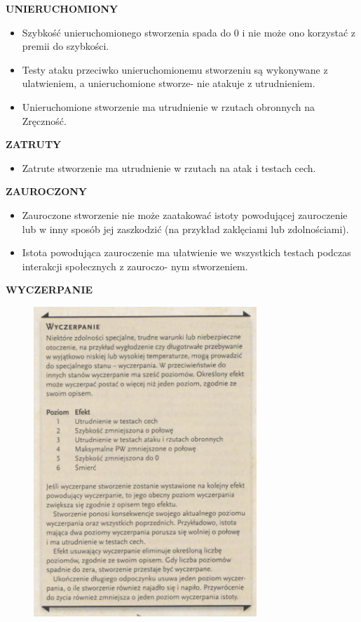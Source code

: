 \documentclass[14pt]{article}
\begin{document}
\textbf{UNIERUCHOMIONY}
\begin{itemize}
    \item Szybkość unieruchomionego stworzenia spada do 0 i nie może ono korzystać z premii do szybkości.
    \item Testy ataku przeciwko unieruchomionemu stworzeniu są wykonywane z ulatwieniem, a unieruchomione stworze- nie atakuje z utrudnieniem.
    \item Unieruchomione stworzenie ma utrudnienie w rzutach obronnych na Zręczność.
\end{itemize}

\textbf{ZATRUTY}
\begin{itemize}
    \item Zatrute stworzenie ma utrudnienie w rzutach na atak i testach cech.
\end{itemize}
\newpage

\textbf{ZAUROCZONY}
\begin{itemize}
    \item Zauroczone stworzenie nie może zaatakować istoty powodującej zauroczenie lub w inny sposób jej zaszkodzić (na przykład zaklęciami lub zdolnościami).
    \item Istota powodująca zauroczenie ma ułatwienie we wszystkich testach podczas interakcji społecznych z zauroczo- nym stworzeniem.
\end{itemize}
\textbf{WYCZERPANIE}
\begin{figure}[ht]
    \centering
    \includegraphics[width=0.75\textwidth]{wyczerpanie.png}
\end{figure}
\newpage
\end{document}
